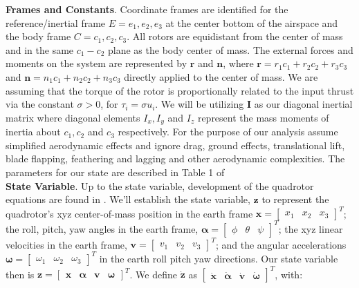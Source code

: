 \documentclass{article}
\begin{document}
\begin{multicols}{2}
\noindent \textbf{Frames and Constants}. Coordinate frames are identified for the reference/inertial frame $E={e_1, e_2, e_3}$ at the center bottom of the airspace and the 
body frame $C={c_1, c_2, c_3}$.  All rotors are equidistant from the center of mass and in the same $c_1-c_2 $ plane as the body 
center of mass.  The external forces and moments on the system are represented by $\boldsymbol{r}$ and $\boldsymbol{n}$, where 
$\boldsymbol{r} = r_1 c_1 + r_2 c_2 + r_3 c_3$ and $\boldsymbol{n} = n_1 c_1 + n_2 c_2 + n_3 c_3$ directly applied to the center 
of mass. We are assuming that the torque of the rotor is proportionally related to the input thrust via the constant $\sigma>0$, for $
\tau_i = \sigma u_i$. We will be utilizing $\boldsymbol{I}$ as our diagonal inertial matrix where diagonal elements  $I_x, I_y $ and 
$I_z$ represent the mass moments of inertia about $c_1, c_2 $ and $c_3$ respectively.  For the purpose of our analysis assume simplified aerodynamic effects and ignore 
 drag, ground effects, translational lift, blade flapping, feathering and lagging and other aerodynamic complexities. The parameters for our state are described in Table 1 of \cite{FaalP}\\

\noindent \textbf{State Variable}.  Up to the state variable, development of the quadrotor equations are found in \cite{FaalD}.  We'll establish the state variable, $\mathbf{z}$ to represent the quadrotor's xyz 
center-of-mass position in the earth 
frame $\mathbf{x}=\begin{bmatrix}x_1 & x_2 & x_3\end{bmatrix}^T$; the roll, pitch, yaw angles in the earth frame, $\bm{\alpha}
=\begin{bmatrix}\phi & \theta & \psi\end{bmatrix}^T$; the xyz linear velocities in the earth frame, $\mathbf{v}=\begin{bmatrix}v_1 & 
v_2 & v_3\end{bmatrix}^T$; and the angular accelerations $\bm{\omega}=\begin{bmatrix}\omega_1 & \omega_2 & 
\omega_3\end{bmatrix}^T$ in the earth roll pitch yaw directions. Our state variable then is $\mathbf{z}=\begin{bmatrix}\mathbf{x}
&\bm{\alpha}&\mathbf{v}&\bm{\omega}\end{bmatrix}^T$. We define $\boldsymbol{\dot{z}}$ as $\begin{bmatrix} \mathbf{\dot{x}}
&\bm{\dot{\alpha}}&\mathbf{\dot{v}}&\bm{\dot{\omega}} \end{bmatrix}^T$, with:


\end{multicols}
\end{document}
